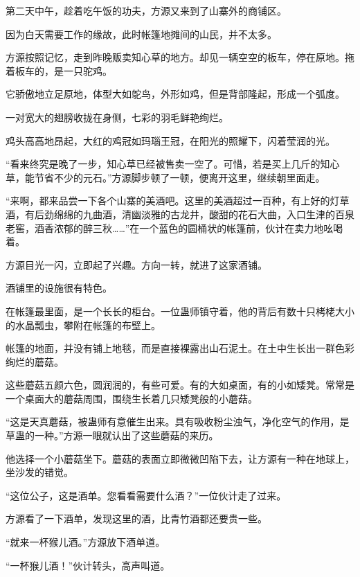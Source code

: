 
\begin{this_body}



第二天中午，趁着吃午饭的功夫，方源又来到了山寨外的商铺区。

因为白天需要工作的缘故，此时帐篷地摊间的山民，并不太多。

方源按照记忆，走到昨晚贩卖知心草的地方。却见一辆空空的板车，停在原地。拖着板车的，是一只驼鸡。

它骄傲地立足原地，体型大如鸵鸟，外形如鸡，但是背部隆起，形成一个弧度。

一对宽大的翅膀收拢在身侧，七彩的羽毛鲜艳绚烂。

鸡头高高地昂起，大红的鸡冠如玛瑙王冠，在阳光的照耀下，闪着莹润的光。

“看来终究是晚了一步，知心草已经被售卖一空了。可惜，若是买上几斤的知心草，能节省不少的元石。”方源脚步顿了一顿，便离开这里，继续朝里面走。

“来啊，都来品尝一下各个山寨的美酒吧。这里的美酒超过一百种，有上好的灯草酒，有后劲绵绵的九曲酒，清幽淡雅的古龙井，酸甜的花石大曲，入口生津的百泉老窖，酒香浓郁的醉三秋……”在一个蓝色的圆桶状的帐篷前，伙计在卖力地吆喝着。

方源目光一闪，立即起了兴趣。方向一转，就进了这家酒铺。

酒铺里的设施很有特色。

在帐篷最里面，是一个长长的柜台。一位蛊师镇守着，他的背后有数十只栲栳大小的水晶瓢虫，攀附在帐篷的布壁上。

帐篷的地面，并没有铺上地毯，而是直接裸露出山石泥土。在土中生长出一群色彩绚烂的蘑菇。

这些蘑菇五颜六色，圆润润的，有些可爱。有的大如桌面，有的小如矮凳。常常是一个桌面大的蘑菇周围，围绕生长着几只矮凳般的小蘑菇。

“这是天真蘑菇，被蛊师有意催生出来。具有吸收粉尘浊气，净化空气的作用，是草蛊的一种。”方源一眼就认出了这些蘑菇的来历。

他选择一个小蘑菇坐下。蘑菇的表面立即微微凹陷下去，让方源有一种在地球上，坐沙发的错觉。

“这位公子，这是酒单。您看看需要什么酒？”一位伙计走了过来。

方源看了一下酒单，发现这里的酒，比青竹酒都还要贵一些。

“就来一杯猴儿酒。”方源放下酒单道。

“一杯猴儿酒！”伙计转头，高声叫道。


\end{this_body}
